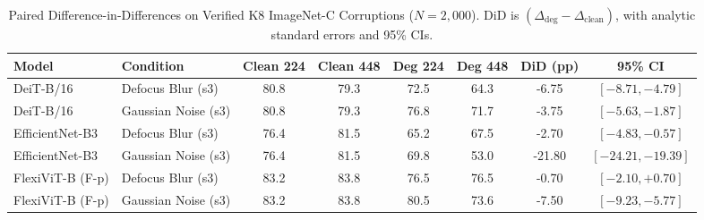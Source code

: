 \begin{table}[t]
\centering
\caption{Paired Difference-in-Differences on Verified K8 ImageNet-C Corruptions ($N=2{,}000$). DiD is $(\Delta_{\text{deg}} - \Delta_{\text{clean}})$, with analytic standard errors and 95\% CIs.}
\label{tab:defocus_did_k8}
\small
\begin{tabular}{llcccccc}
\toprule
Model & Condition & Clean 224 & Clean 448 & Deg 224 & Deg 448 & DiD (pp) & 95\% CI \\
\midrule
DeiT-B/16 & Defocus Blur (s3) & 80.8 & 79.3 & 72.5 & 64.3 & -6.75 & $[-8.71, -4.79]$ \\
DeiT-B/16 & Gaussian Noise (s3) & 80.8 & 79.3 & 76.8 & 71.7 & -3.75 & $[-5.63, -1.87]$ \\
EfficientNet-B3 & Defocus Blur (s3) & 76.4 & 81.5 & 65.2 & 67.5 & -2.70 & $[-4.83, -0.57]$ \\
EfficientNet-B3 & Gaussian Noise (s3) & 76.4 & 81.5 & 69.8 & 53.0 & -21.80 & $[-24.21, -19.39]$ \\
FlexiViT-B (F-p) & Defocus Blur (s3) & 83.2 & 83.8 & 76.5 & 76.5 & -0.70 & $[-2.10, +0.70]$ \\
FlexiViT-B (F-p) & Gaussian Noise (s3) & 83.2 & 83.8 & 80.5 & 73.6 & -7.50 & $[-9.23, -5.77]$ \\
\bottomrule
\end{tabular}
\end{table}